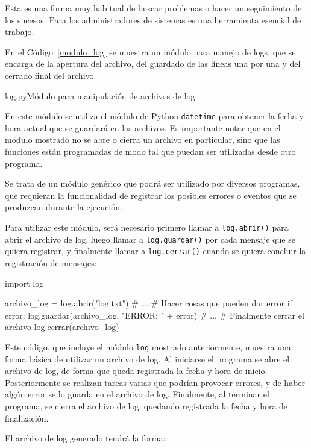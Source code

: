 Esta es una forma muy habitual de buscar problemas o hacer un seguimiento
de los sucesos. Para los administradores de sistemas es una herramienta
esencial de trabajo.

En el Código~\ref{modulo_log} se muestra un módulo para manejo de logs, que
se encarga de la apertura del archivo, del guardado de las líneas una por
una y del cerrado final del archivo.

\begin{codigo}{log.py}{Módulo para manipulación de archivos de log}
\label{modulo_log}

\end{codigo}

En este módulo se utiliza el módulo de Python \lstinline!datetime! para
obtener la fecha y hora actual que se guardará en los archivos.  Es
importante notar que en el módulo mostrado no se abre o cierra un archivo
en particular, sino que las funciones están programadas de modo tal que
puedan ser utilizadas desde otro programa.

Se trata de un módulo genérico que podrá ser utilizado por diversos programas,
que requieran la funcionalidad de registrar los posibles errores o eventos que
se produzcan durante la ejecución.

Para utilizar este módulo, será necesario primero llamar a
\lstinline!log.abrir()! para abrir el archivo de log, luego llamar a
\lstinline!log.guardar()! por cada mensaje que se quiera registrar, y
finalmente llamar a \lstinline!log.cerrar()! cuando se quiera concluir la
registración de mensajes:

\begin{codigo-python-sn}
import log

archivo_log = log.abrir("log.txt")
# ...
# Hacer cosas que pueden dar error
if error:
    log.guardar(archivo_log, "ERROR: " + error)
# ...
# Finalmente cerrar el archivo
log.cerrar(archivo_log)
\end{codigo-python-sn}

Este código, que incluye el módulo \lstinline!log! mostrado anteriormente,
muestra una forma básica de utilizar un archivo de log.  Al iniciarse el
programa se abre el archivo de log, de forma que queda registrada la fecha
y hora de inicio.  Posteriormente se realizan tareas varias que podrían
provocar errores, y de haber algún error se lo guarda en el archivo de log.
Finalmente, al terminar el programa, se cierra el archivo de log, quedando
registrada la fecha y hora de finalización.

El archivo de log generado tendrá la forma:

